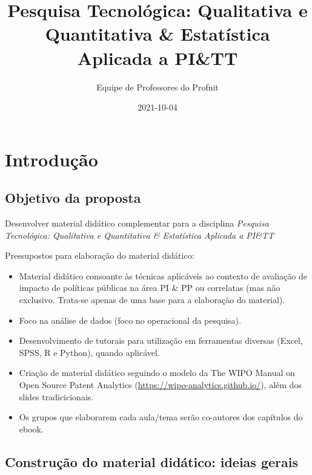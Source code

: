 \documentclass[
]{book}
\title{Pesquisa Tecnológica: Qualitativa e Quantitativa \& Estatística Aplicada a PI\&TT}
\author{Equipe de Professores do Profnit}
\date{2021-10-04}
\begin{document}
\maketitle

{
\setcounter{tocdepth}{1}
\tableofcontents
}
\hypertarget{introduuxe7uxe3o}{%
\chapter{Introdução}\label{introduuxe7uxe3o}}

\hypertarget{objetivo-da-proposta}{%
\section{Objetivo da proposta}\label{objetivo-da-proposta}}

Desenvolver material didático complementar para a disciplina \emph{Pesquisa Tecnológica: Qualitativa e Quantitativa \& Estatística Aplicada a PI\&TT}

Pressupostos para elaboração do material didático:

\begin{itemize}
\item
  Material didático consoante às técnicas aplicáveis ao contexto de avaliação de impacto de políticas públicas na área PI \& PP ou correlatas (mas não exclusivo. Trata-se apenas de uma base para a elaboração do material).
\item
  Foco na análise de dados (foco no operacional da pesquisa).
\item
  Desenvolvimento de tutorais para utilização em ferramentas diversas (Excel, SPSS, R e Python), quando aplicável.
\item
  Criação de material didático seguindo o modelo da The WIPO Manual on Open Source Patent Analytics (\url{https://wipo-analytics.github.io/}), além dos slides tradicicionais.
\item
  Os grupos que elaborarem cada aula/tema serão co-autores dos capítulos do ebook.
\end{itemize}

\hypertarget{construuxe7uxe3o-do-material-diduxe1tico-ideias-gerais}{%
\section{Construção do material didático: ideias gerais}\label{construuxe7uxe3o-do-material-diduxe1tico-ideias-gerais}}
\end{document}
